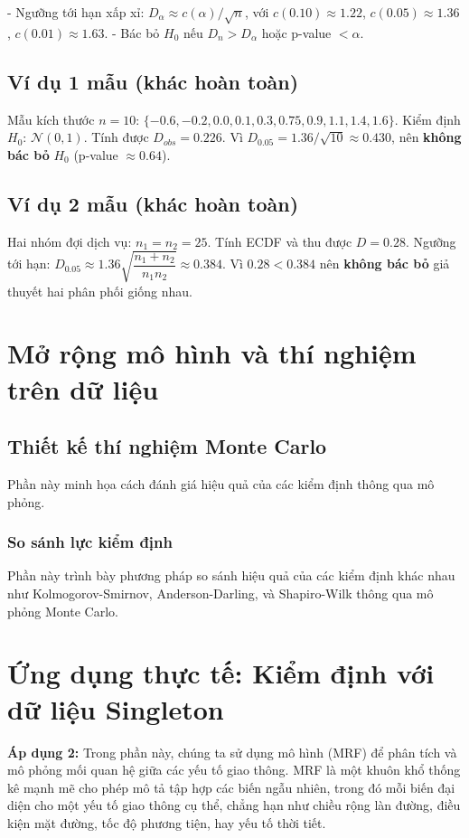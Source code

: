 \begin{tinhchat}
- Ngưỡng tới hạn xấp xỉ: $D_{\alpha}\approx c(\alpha)/\sqrt{n}$, với $c(0.10)\approx1.22$, $c(0.05)\approx1.36$, $c(0.01)\approx1.63$.
- Bác bỏ $H_0$ nếu $D_n>D_{\alpha}$ hoặc p-value $<\alpha$.
\end{tinhchat}

\subsection{Ví dụ 1 mẫu (khác hoàn toàn)}
Mẫu kích thước $n=10$: $\{-0.6,-0.2,0.0,0.1,0.3,0.75,0.9,1.1,1.4,1.6\}$. Kiểm định $H_0$: $\mathcal{N}(0,1)$. Tính được $D_{obs}=0.226$. Vì $D_{0.05}=1.36/\sqrt{10}\approx0.430$, nên \textbf{không bác bỏ} $H_0$ (p-value $\approx0.64$).

\subsection{Ví dụ 2 mẫu (khác hoàn toàn)}
Hai nhóm đợi dịch vụ: $n_1=n_2=25$. Tính ECDF và thu được $D=0.28$. Ngưỡng tới hạn: $D_{0.05}\approx1.36\sqrt{\dfrac{n_1+n_2}{n_1n_2}}\approx0.384$. Vì $0.28<0.384$ nên \textbf{không bác bỏ} giả thuyết hai phân phối giống nhau.



\section{Mở rộng mô hình và thí nghiệm trên dữ liệu}

\subsection{Thiết kế thí nghiệm Monte Carlo}
Phần này minh họa cách đánh giá hiệu quả của các kiểm định thông qua mô phỏng.

\subsubsection*{So sánh lực kiểm định}
Phần này trình bày phương pháp so sánh hiệu quả của các kiểm định khác nhau như Kolmogorov-Smirnov, Anderson-Darling, và Shapiro-Wilk thông qua mô phỏng Monte Carlo.

\section{Ứng dụng thực tế: Kiểm định với dữ liệu Singleton}

\textbf{Áp dụng 2:} Trong phần này, chúng ta sử dụng mô hình  (MRF) để phân tích và mô phỏng mối quan hệ giữa các yếu tố giao thông. MRF là một khuôn khổ thống kê mạnh mẽ cho phép mô tả tập hợp các biến ngẫu nhiên, trong đó mỗi biến đại diện cho một yếu tố giao thông cụ thể, chẳng hạn như chiều rộng làn đường, điều kiện mặt đường, tốc độ phương tiện, hay yếu tố thời tiết.

